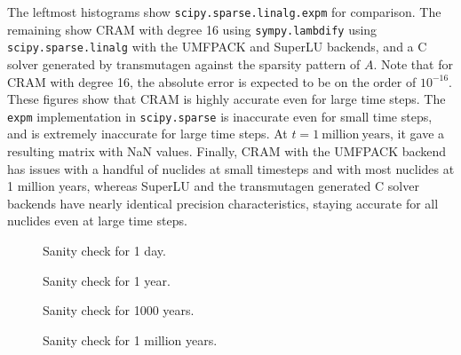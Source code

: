 The leftmost histograms show
\texttt{scipy.\allowbreak{}sparse.\allowbreak{}linalg.\allowbreak{}expm} for
comparison. The remaining show CRAM with degree 16 using
\texttt{sympy.\allowbreak{}lambdify} using
\texttt{scipy.\allowbreak{}sparse.\allowbreak{}linalg} with the UMFPACK and
SuperLU backends, and a C solver generated by transmutagen against the
sparsity pattern of $A$. Note that for CRAM with degree 16, the absolute error
is expected to be on the order of $10^{-16}$. These figures show that CRAM is
highly accurate even for large time steps. The \texttt{expm} implementation in
\texttt{scipy.\allowbreak{}sparse} is inaccurate even for small time steps,
and is extremely inaccurate for large time steps. At
$t = 1 \mathrm{\ million\ years}$, it gave a resulting matrix with NaN values.
Finally, CRAM with the UMFPACK backend has issues with a handful of nuclides
at small timesteps and with most nuclides at 1 million years, whereas SuperLU
and the transmutagen generated C solver backends have nearly identical
precision characteristics, staying accurate for all nuclides even at large
time steps.

\begin{figure}[!ht]
\centering
\resizebox{0.9\textwidth}{!}{}
\caption{Sanity check for 1 day.}
\label{fig:nofission-pwru50-1-day}
\end{figure}

\begin{figure}[!ht]
\centering
\resizebox{0.9\textwidth}{!}{}
\caption{Sanity check for 1 year.}
\label{fig:nofission-pwru50-1-year}
\end{figure}

\begin{figure}[!ht]
\centering
\resizebox{0.9\textwidth}{!}{}
\caption{Sanity check for 1000 years.}
\label{fig:nofission-pwru50-1000-years}
\end{figure}

\begin{figure}[!ht]
\centering
\resizebox{0.9\textwidth}{!}{}
\caption{Sanity check for 1 million years.}
\label{fig:nofission-pwru50-1-million-years}
\end{figure}
